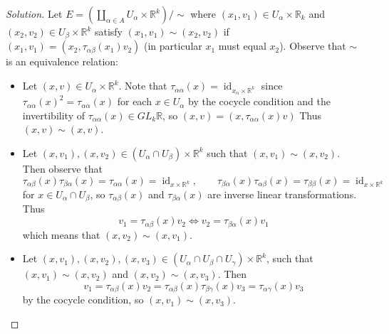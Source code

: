 \documentclass[10pt]{article}
\providecommand{\RR}{\mathbb R}
\providecommand{\ii}{\item}
\newenvironment{soln}{\begin{proof}[Solution]}{\end{proof}}
\begin{document}
\begin{soln}
    Let $E = (\coprod_{\alpha\in A} U_\alpha\times\RR^k)/{\sim}$
    where $(x_1,v_1)\in U_\alpha\times\RR_k$
    and $(x_2,v_2)\in U_\beta\times\RR^k$
    satisfy $(x_1,v_1)\sim(x_2,v_2)$ if
    $(x_1,v_1) = (x_2,\tau_{\alpha\beta}(x_1)v_2)$
    (in particular $x_1$ must equal $x_2$).
    Observe that $\sim$ is an equivalence relation:
    \begin{itemize}
        \ii Let $(x,v)\in U_\alpha\times\RR^k$.
        Note that
        $\tau_{\alpha\alpha}(x) = \operatorname{id}_{x_\alpha\times\RR^k}$
        since $\tau_{\alpha\alpha}(x)^2 = \tau_{\alpha\alpha}(x)$
        for each $x\in U_\alpha$ by the cocycle condition and
        the invertibility of $\tau_{\alpha\alpha}(x)\in GL_k\RR$,
        so $(x,v) = (x,\tau_{\alpha\alpha}(x)v)$
        Thus $(x,v)\sim(x,v)$.
        \ii Let $(x,v_1),(x,v_2)\in (U_\alpha\cap U_\beta)\times\RR^k$
        such that $(x,v_1)\sim(x,v_2)$. Then observe that
        \begin{equation*}
            \tau_{\alpha\beta}(x)\tau_{\beta\alpha}(x) = \tau_{\alpha\alpha}(x)
            = \operatorname{id}_{x\times\RR^k},\qquad
            \tau_{\beta\alpha}(x)\tau_{\alpha\beta}(x) = \tau_{\beta\beta}(x)
            = \operatorname{id}_{x\times\RR^k}
        \end{equation*}
        for $x\in U_\alpha\cap U_\beta$, so $\tau_{\alpha\beta}(x)$
        and $\tau_{\beta\alpha}(x)$ are inverse linear transformations. Thus
        \begin{equation*}
            v_1 = \tau_{\alpha\beta}(x)v_2
            \iff v_2 = \tau_{\beta\alpha}(x)v_1
        \end{equation*}
        which means that $(x,v_2)\sim(x,v_1)$.
        \ii Let $(x,v_1),(x,v_2),(x,v_3)\in
        (U_\alpha\cap U_\beta\cap U_\gamma) \times\RR^k$,
        such that $(x,v_1)\sim (x,v_2)$ and $(x,v_2)\sim(x,v_3)$. Then
        \begin{equation*}
            v_1 = \tau_{\alpha\beta}(x)v_2
            = \tau_{\alpha\beta}(x)\tau_{\beta\gamma}(x)v_3
            = \tau_{\alpha\gamma}(x)v_3
        \end{equation*}
        by the cocycle condition, so $(x,v_1)\sim(x,v_3)$.
    \end{itemize}


\end{soln}
\end{document}
